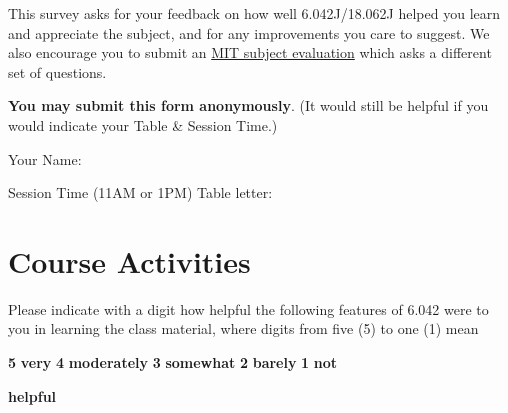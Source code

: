 \documentclass[handout]{mcs}
\begin{document}

This survey asks for your feedback on how well 6.042J/18.062J helped
you learn and appreciate the subject, and \iffalse .  Comparing
student self-assessments given in this survey to student grades helps
us determine how to improve the course.  We would also be grateful\fi
for any improvements you care to suggest.  We also encourage you to
submit an
\href{http://web.mit.edu/subjectevaluation/evaluate.html}{MIT subject
  evaluation} which asks a different set of questions.

\textbf{You may submit this form anonymously}.  (It would still be
helpful if you would indicate your Table \& Session Time.)

\large{Your Name:} \brule{3in}

Session Time (11AM or 1PM)\brule{0.5in}    Table letter: \brule{0.5in}


\section*{Course Activities}

Please indicate with a digit how helpful the following features of
6.042 were to you in learning the class material, where digits from
five (5) to one (1) mean
\begin{center}
\textbf{5}  \textbf{very} \qquad
\textbf{4}  \textbf{moderately}\qquad
\textbf{3} \textbf{somewhat}\qquad
\textbf{2} \textbf{barely}\qquad
\textbf{1} \textbf{not}

  \textbf{helpful}
\end{center}

\iffalse
 How helpful have the following aspects of the course been in
achieving the subject outcomes for you personally:
\fi
\end{document}

